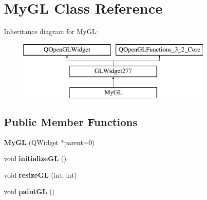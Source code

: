 \hypertarget{class_my_g_l}{}\section{My\+G\+L Class Reference}
\label{class_my_g_l}
Inheritance diagram for My\+G\+L\+:\begin{figure}[H]
\begin{center}
\leavevmode
\includegraphics[height=3.000000cm]{class_my_g_l}
\end{center}
\end{figure}
\subsection*{Public Member Functions}
\begin{DoxyCompactItemize}
\item 
\hypertarget{class_my_g_l_a86800be88b23dea695a8b2101d9de2c2}{}{\bfseries My\+G\+L} (Q\+Widget $\ast$parent=0)\label{class_my_g_l_a86800be88b23dea695a8b2101d9de2c2}

\item 
\hypertarget{class_my_g_l_a49ac17e71b1966defbcf305ad2b5f2f0}{}void {\bfseries initialize\+G\+L} ()\label{class_my_g_l_a49ac17e71b1966defbcf305ad2b5f2f0}

\item 
\hypertarget{class_my_g_l_ada6f28601e14f31aae6338aaf1080029}{}void {\bfseries resize\+G\+L} (int, int)\label{class_my_g_l_ada6f28601e14f31aae6338aaf1080029}

\item 
\hypertarget{class_my_g_l_aa3a4e0894b90c26c2c7c0f2d0e191642}{}void {\bfseries paint\+G\+L} ()\label{class_my_g_l_aa3a4e0894b90c26c2c7c0f2d0e191642}

\end{DoxyCompactItemize}
